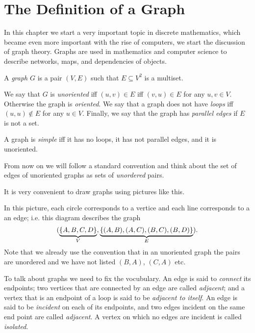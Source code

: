 \chapter{The Definition of a Graph}
\label{chapter:graph-theory-basics}
In this chapter we start a very important topic in discrete mathematics, which
became even more important with the rise of computers, we start the discussion
of graph theory. Graphs are used in mathematics and computer science to describe
networks, maps, and dependencies of objects.

\begin{definition}
  A \emph{graph} $G$ is a pair $(V, E)$ such that $E \subseteq V^2$ is a multiset.

  We say that $G$ is \emph{unoriented} iff $(u, v) \in E$ iff $(v, u) \in E$ for
  any $u, v \in V$. Otherwise the graph is \emph{oriented}.
  We say that a graph does not have \emph{loops} iff $(u, u) \notin E$ for any
  $u \in V$. Finally, we say that the graph has \emph{parallel edges} if
  $E$ is not a set.
\end{definition}
A graph is \emph{simple} iff it has no loops, it has not parallel edges, and
it is unoriented.

From now on we will follow a standard convention and think about the set of
edges of unoriented graphs as sets of \emph{unordered} pairs.

It is very convenient to draw graphs using pictures like this.
\begin{center}
\end{center}
In this picture, each circle corresponds to a vertice and each line corresponds
to a an edge; i.e. this diagram describes the graph
\[
  (\underbrace{\set{A, B, C, D}}_V,
  \underbrace{\set{(A, B), (A, C), (B, C), (B, D)}}_E).
\]
Note that we already use the convention that in an unoriented graph the pairs
are unordered and we have not listed $(B, A)$, $(C, A)$ etc.

To talk about graphs we need to fix the vocubulary.
An edge is said to \emph{connect} its endpoints; two vertices that are
connected by an edge are called \emph{adjacent}; and a vertex that is an
endpoint of a loop is said to be \emph{adjacent to itself}. An edge is said to
be \emph{incident} on each of its endpoints, and two edges incident
on the same end point are called \emph{adjacent}. A vertex on which no edges
are incident is called \emph{isolated}.

